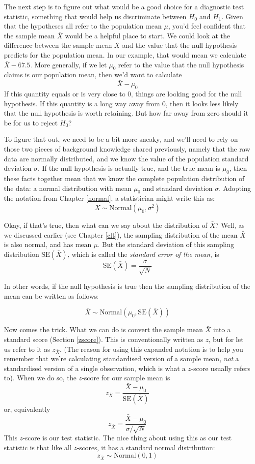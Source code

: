 \documentclass[
  11pt,
  a4paper,
  twoside,symmetric,openright]{book}
\theoremstyle{break}
\theoremstyle{break}
\begin{document}
The next step is to figure out what would be a good choice for a diagnostic test statistic, something that would help us discriminate between \(H_0\) and \(H_1\). Given that the hypotheses all refer to the population mean \(\mu\), you'd feel confident that the sample mean \(\bar{X}\) would be a helpful place to start. We could look at the difference between the sample mean \(\bar{X}\) and the value that the null hypothesis predicts for the population mean. In our example, that would mean we calculate \(\bar{X} - 67.5\). More generally, if we let \(\mu_0\) refer to the value that the null hypothesis claims is our population mean, then we'd want to calculate
\[
\bar{X} - \mu_0
\]
If this quantity equals or is very close to 0, things are looking good for the null hypothesis. If this quantity is a long way away from 0, then it looks less likely that the null hypothesis is worth retaining. But how far away from zero should it be for us to reject \(H_0\)?

To figure that out, we need to be a bit more sneaky, and we'll need to rely on those two pieces of background knowledge shared previously, namely that the raw data are normally distributed, and we know the value of the population standard deviation \(\sigma\). If the null hypothesis is actually true, and the true mean is \(\mu_0\), then these facts together mean that we know the complete population distribution of the data: a normal distribution with mean \(\mu_0\) and standard deviation \(\sigma\). Adopting the notation from Chapter \ref{normal}, a statistician might write this as:
\[
X \sim \mbox{Normal}(\mu_0,\sigma^2)
\]

Okay, if that's true, then what can we say about the distribution of \(\bar{X}\)? Well, as we discussed earlier (see Chapter \ref{clt}), the sampling distribution of the mean \(\bar{X}\) is also normal, and has mean \(\mu\). But the standard deviation of this sampling distribution \(\mbox{SE}({\bar{X}})\), which is called the \emph{standard error of the mean}, is
\[
\mbox{SE}({\bar{X}}) = \frac{\sigma}{\sqrt{N}}
\]

In other words, if the null hypothesis is true then the sampling distribution of the mean can be written as follows:

\[
\bar{X} \sim \mbox{Normal}(\mu_0,\mbox{SE}({\bar{X}}))
\]

Now comes the trick. What we can do is convert the sample mean \(\bar{X}\) into a standard score (Section \ref{zscore}). This is conventionally written as \(z\), but for let us refer to it as \(z_{\bar{X}}\). (The reason for using this expanded notation is to help you remember that we're calculating standardised version of a sample mean, \emph{not} a standardised version of a single observation, which is what a \(z\)-score usually refers to). When we do so, the \(z\)-score for our sample mean is
\[
z_{\bar{X}} = \frac{\bar{X} - \mu_0}{\mbox{SE}({\bar{X}})}
\]
or, equivalently
\[
z_{\bar{X}} =  \frac{\bar{X} - \mu_0}{\sigma / \sqrt{N}}
\]
This \(z\)-score is our test statistic. The nice thing about using this as our test statistic is that like all \(z\)-scores, it has a standard normal distribution:
\[
z_{\bar{X}} \sim \mbox{Normal}(0,1)
\]
\end{document}

